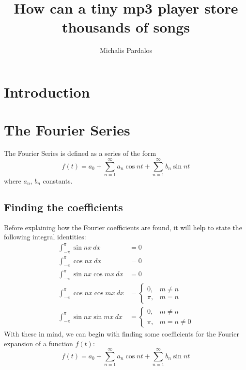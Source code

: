\documentclass [12pt, titlepage]{article}
\title{How can a tiny mp3 player store thousands of songs}
\author{Michalis Pardalos}
\date{}
\numberwithin{equation}{section}
\let\oldsection\section
\renewcommand\section{\clearpage\oldsection}
\newcommand{\piint}{\int_{-\pi}^{\pi}} %
\begin{document}
\maketitle
\tableofcontents

\section{Introduction}
\section{The Fourier Series}

The Fourier Series is defined as a series of the form
%
\begin{equation} \label{eq:fourier_series}
    f(t) = a_0 + \sum_{n=1}^{\infty}a_n \cos{nt} + \sum_{n=1}^{\infty}b_n \sin{nt}
\end{equation}
%
where $a_n$, $b_n$ constants. 

\subsection{Finding the coefficients} \label{sec:fourier_coefficients}

Before explaining how the Fourier coefficients are found, it will help to state the
following integral identities:\autocite[438]{courant_calculus_1}
%
\begin{align}
    \piint \sin{nx}\ dx          & = 0 \label{eq:sinint}\\
    \piint \cos{nx}\ dx          & = 0 \label{eq:cosint}\\
    \piint \sin{nx}\cos{mx}\ dx & = 0\label{eq:sincosint}\\
    \piint \cos{nx}\cos{mx}\ dx & =
    \begin{cases}
        0,   & m\not=n\\
        \pi, & m=n
    \end{cases} \label{eq:coscosint}\\
    \piint \sin{nx}\sin{mx}\ dx &= 
    \begin{cases}
        0,   & m\not=n\\
        \pi, & m=n\not=0
    \end{cases} \label{eq:sinsinint}
\end{align}
%
With these in mind, we can begin with finding some coefficients for the Fourier expansion of
a function $f(t)$:
%
\begin{equation*}
    f(t) = a_0 + \sum_{n=1}^\infty a_n \cos{nt} + \sum_{n=1}^{\infty} b_n \sin{nt}
\end{equation*}
%
\end{document}
